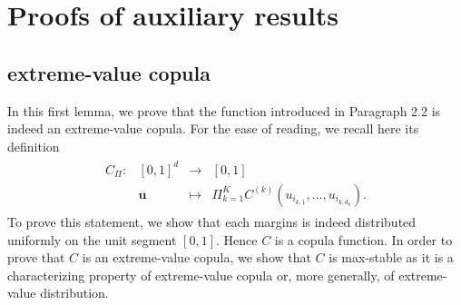 \documentclass[11pt]{article}
\theoremstyle{definition}
\begin{document}
	\section{Proofs of auxiliary results}
		\subsection{extreme-value copula}
        
        In this first lemma, we prove that the function introduced in Paragraph 2.2 is indeed an extreme-value copula. For the ease of reading, we recall here its definition
        \begin{align*}
			\begin{array}{lrcl}
C_{\Pi} : & [0,1]^d & \longrightarrow & [0,1] \\
    & \textbf{u} & \longmapsto & \Pi_{k=1}^K C^{(k)}(u_{i_{k,1}}, \dots, u_{i_{k,d_k}}). \end{array}
		\end{align*}
		To prove this statement, we show that each margins is indeed distributed uniformly on the unit segment $[0,1]$. Hence $C$ is a copula function. In order to prove that $C$ is an extreme-value copula, we show that $C$ is max-stable as it is a characterizing property of extreme-value copula or, more generally, of extreme-value distribution.
\end{document}

